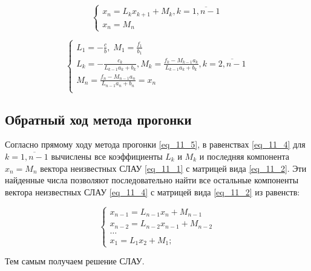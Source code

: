 \documentclass[__main__.tex]{subfiles}
\begin{document}
\begin{equation}
\label{eq_11_4}
\begin{cases}
x_n = L_k x_{k+1} + M_k, k = \overline{1, n-1}\\
x_n = M_n
\end{cases}
\end{equation}

\begin{equation}
\label{eq_11_5}
\begin{cases}
L_1 = -\frac{c}{b}, \; M_1 = \frac{f_1}{b_1}\\
L_k = -\frac{c_k}{L_{k-1} a_k + b_k}, M_k = \frac{f_k - M_{k-1} a_k}{L_{k-1} a_k + b_k}, k = \overline{2, n - 1}\\
M_n = \frac{f_n - M_{n-1} a_n}{L_{n-1}a_n + b_n} = x_n\\
\end{cases}
\end{equation}

\subsection{Обратный ход метода прогонки}

Согласно прямому ходу метода прогонки \ref{eq_11_5}, в равенствах \ref{eq_11_4} для $k = \overline{1, n - 1}$ вычислены все коэффициенты $L_k$ и $M_k$ и последняя компонента $x_n = M_n$ вектора неизвестных СЛАУ \ref{eq_11_1} с матрицей вида \ref{eq_11_2}. Эти найденные числа позволяют последовательно найти все остальные компоненты вектора неизвестных СЛАУ \ref{eq_11_4} с матрицей вида \ref{eq_11_2} из равенств:

\begin{equation}
\begin{cases}
x_{n-1} = L_{n-1}x_n + M_{n-1}\\
x_{n-2} = L_{n-2}x_{n-1} + M_{n-2}\\
\hdots\\
x_1 = L_1 x_2 + M_1;
\end{cases}
\end{equation}

Тем самым получаем решение СЛАУ.
\end{document}
